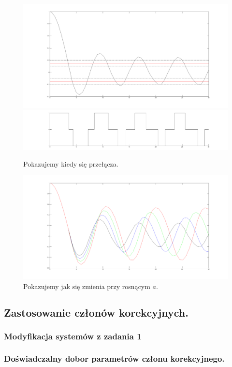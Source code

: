 \documentclass[a4paper,10pt]{article}
\begin{document}
\begin{figure}[!h]
    \centering
	\includegraphics[width=120mm]{CW3-trojpolozeniowy-e-n015-a005.png}
	\includegraphics[width=120mm]{CW3-trojpolozeniowy-u-n015-a005.png}
	\caption{Pokazujemy kiedy się przełącza.}
    \label{fig:Rysunek}
\end{figure}

\begin{figure}[!h]
    \centering
	\includegraphics[width=120mm]{CW3-trojpolozeniowy-e-n015.png}
	\caption{Pokazujemy jak się zmienia przy rosnącym $a$.}
    \label{fig:Rysunek}
\end{figure}
\subsection{Zastosowanie członów korekcyjnych.}\label{sec:zad2}
\subsubsection{Modyfikacja systemów z zadania 1}\label{sec:zad2_1}
\subsubsection{Doświadczalny dobor parametrów członu korekcyjnego.}\label{sec:zad2_2}
\end{document}
